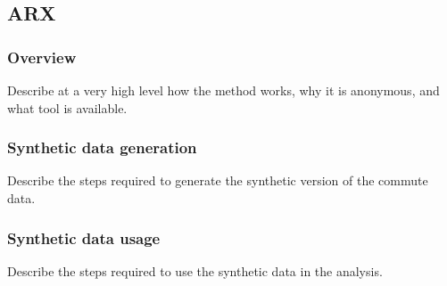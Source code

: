 \subsection{ARX}
\label{sec:method_arx}


\subsubsection{Overview}

Describe at a very high level how the method works, why it is anonymous, and what tool is available.

\subsubsection{Synthetic data generation}

Describe the steps required to generate the synthetic version of the commute data.

\subsubsection{Synthetic data usage}

Describe the steps required to use the synthetic data in the analysis.